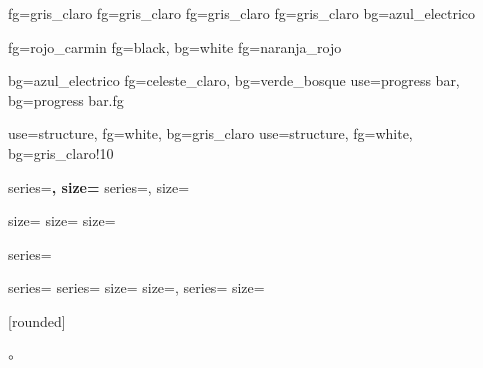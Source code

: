 
					{fg=gris_claro}
					{fg=gris_claro}
					{fg=gris_claro}
				{fg=gris_claro}
					{bg=azul_electrico}

			{fg=rojo_carmin}
			{fg=black, bg=white}
				{fg=naranja_rojo}

					{bg=azul_electrico}
			{fg=celeste_claro, bg=verde_bosque}
	{use=progress bar, bg=progress bar.fg}


			{use=structure, fg=white, bg=gris_claro}
				{use=structure, fg=white, bg=gris_claro!10}



					{series=\bfseries, size=\Large}
				{series=\mdseries, size=\normalsize}

					{size=\small}
					{size=\footnotesize}
				{size=\footnotesize}

			{series=\bfseries}

				{series=\bfseries}
			{series=\mdseries}
				{size=\scriptsize}
				{size=\normalsize, series=\bfseries}
				{size=\normalsize}






[rounded]

		{\textbullet}
		{\textemdash}
	{\ensuremath{\circ}}

